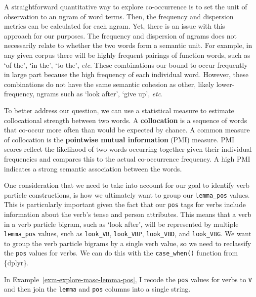 \documentclass[
  letterpaper,
  krantz1]{latex/krantz-mod}
\theoremstyle{definition}
\theoremstyle{definition}
\theoremstyle{remark}
\begin{document}
A straightforward quantitative way to explore co-occurrence is to set
the unit of observation to an
ngram of word terms. Then, the frequency and dispersion
metrics can be calculated for each ngram. Yet, there is an issue with
this approach for our purposes. The frequency and dispersion of ngrams
does not necessarily relate to whether the two words form a semantic
unit. For example, in any given corpus there will be highly frequent
pairings of function words, such as `of the', `in the', `to the',
\emph{etc}. These combinations our bound to occur frequently in large
part because the high frequency of each individual word. However, these
combinations do not have the same semantic cohesion as other, likely
lower-frequency, ngrams such as `look after', `give up', \emph{etc}.

To better address our question, we can use a statistical measure to
estimate collocational strength between two words. A
\textbf{collocation} is a sequence of words that
co-occur more often than would be expected by chance. A common measure
of collocation is the \textbf{pointwise mutual information}
(PMI) measure. PMI scores
reflect the likelihood of two words occurring together given their
individual frequencies and compares this to the actual co-occurrence
frequency. A high PMI indicates a strong semantic association between
the words.

One consideration that we need to take into account for our goal to
identify verb particle constructions, is how we ultimately want to group
our \texttt{lemma\_pos} values. This is particularly important given the
fact that our \texttt{pos} tags for verbs include information about the
verb's tense and person attributes. This means that a verb in a verb
particle bigram, such as `look after', will be represented by multiple
\texttt{lemma\_pos} values, such as \texttt{look\_VB},
\texttt{look\_VBP}, \texttt{look\_VBD}, and \texttt{look\_VBG}. We want
to group the verb particle bigrams by a single verb value, so we need to
reclassify the \texttt{pos} values for
verbs. We can do this with the \texttt{case\_when()} function from
\{dplyr\}.

In Example~\ref{exm-explore-masc-lemma-pos}, I recode the \texttt{pos}
values for verbs to \texttt{V} and then join the \texttt{lemma} and
\texttt{pos} columns into a single string.
\end{document}
